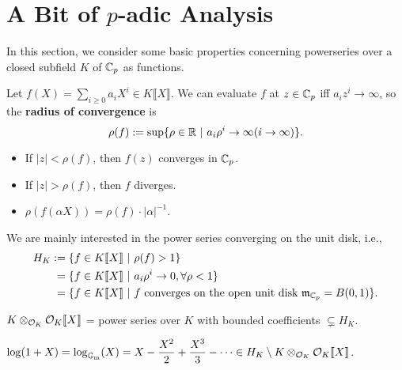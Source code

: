 \section{\texorpdfstring{A Bit of $p$-adic Analysis}{A bit of p-adic analysis}}
In this section, we consider some basic properties concerning powerseries over a closed subfield $K$ of $\mathbb{C}_p$ as functions.

Let $f(X) = \sum_{i\ge 0} a_iX^i\in K\llbracket X\rrbracket $. We can evaluate $f$ at $z\in \mathbb{C}_p$ iff $a_iz^i\to\infty$, so the \textbf{radius of convergence}
is \[\rho(f) := \sup\{\rho\in\mathbb{R}\ |\ a_i\rho^i\to\infty (i\to\infty)\}.\]
\begin{itemize}
    \item If $|z| < \rho(f)$, then $f(z)$ converges in $\mathbb{C}_p$.
    \item If $|z| > \rho(f)$, then $f$ diverges.
    \item $\rho(f(\alpha X)) = \rho(f)\cdot |\alpha|^{-1}$.
\end{itemize}
We are mainly interested in the power series converging on the unit disk, i.e., \begin{align*}
    H_K :={}& \{f\in K\llbracket X\rrbracket\ |\ \rho(f) > 1\}\\
    ={}&  \{f\in K\llbracket X\rrbracket\ |\ a_i\rho^i\to 0, \forall \rho < 1\}\\
    ={}&  \{f\in K\llbracket X\rrbracket\ |\ f\text{ converges on the open unit disk }\mathfrak{m}_{\mathbb{C}_p} = B(0, 1)\}.
\end{align*}
\begin{example}
    $K\otimes_{\mathcal{O}_K}\mathcal{O}_K\llbracket X\rrbracket$ = power series over $K$ with bounded coefficients $\subsetneq H_K$.
\end{example}
\begin{example}
    $\log(1 + X) = \log_{{\mathbb{G}_{\mathrm{m}}}}(X) = X - \displaystyle\frac{X^2}{2} + \frac{X^3}{3} - \dots\in H_K\setminus K\otimes_{\mathcal{O}_K}\mathcal{O}_K\llbracket X\rrbracket$.
\end{example}

